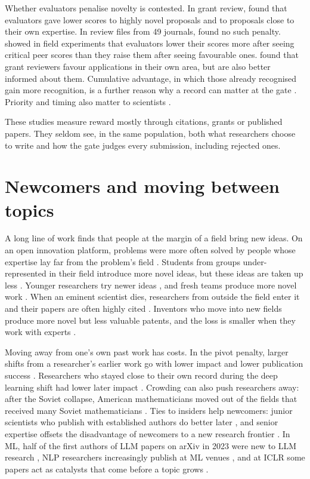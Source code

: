 Whether evaluators penalise novelty is contested. In grant review, \citet{boudreau2016looking} found that evaluators
gave lower scores to highly novel proposals and to proposals close to their own expertise. In review files from 49
journals, \citet{teplitskiy2022is} found no such penalty. \citet{lane2022conservatism} showed in field experiments that
evaluators lower their scores more after seeing critical peer scores than they raise them after seeing favourable ones.
\citet{li2017expertise} found that grant reviewers favour applications in their own area, but are also better informed
about them. Cumulative advantage, in which those already recognised gain more recognition, is a further reason why a
record can matter at the gate \citep{merton1968matthew}. Priority and timing also matter to scientists
\citep{merton1957priorities}.

These studies measure reward mostly through citations, grants or published papers. They seldom see, in the same
population, both what researchers choose to write and how the gate judges every submission, including rejected ones.

\section{Newcomers and moving between topics}
\label{sec:lit-entry}

A long line of work finds that people at the margin of a field bring new ideas. On an open innovation platform,
problems were more often solved by people whose expertise lay far from the problem's field
\citep{jeppesen2010marginality}. Students from groups under-represented in their field introduce more novel ideas, but
these ideas are taken up less \citep{hofstra2020diversity}. Younger researchers try newer ideas
\citep{packalen2019age}, and fresh teams produce more novel work \citep{zeng2021fresh}. When an eminent scientist dies,
researchers from outside the field enter it and their papers are often highly cited \citep{azoulay2019does}. Inventors
who move into new fields produce more novel but less valuable patents, and the loss is smaller when they work with
experts \citep{arts2018paradise}.

Moving away from one's own past work has costs. In the pivot penalty, larger shifts from a researcher's earlier work go
with lower impact and lower publication success \citep{hill2025pivot}. Researchers who stayed close to their own record
during the deep learning shift had lower later impact \citep{bao2025persistence}. Crowding can also push researchers
away: after the Soviet collapse, American mathematicians moved out of the fields that received many Soviet
mathematicians \citep{borjas2015cognitive}. Ties to insiders help newcomers: junior scientists
who publish with established authors do better later \citep{sekara2018chaperone}, and senior expertise offsets the
disadvantage of newcomers to a new research frontier \citep{biliotti2024breaking}. In ML, half of the first
authors of LLM papers on arXiv in 2023 were new to LLM research \citep{movva2024topics}, NLP researchers increasingly publish at
ML venues \citep{jurgens2026future}, and at ICLR some papers act as catalysts that come before a topic grows
\citep{huang2026catalyst}.

